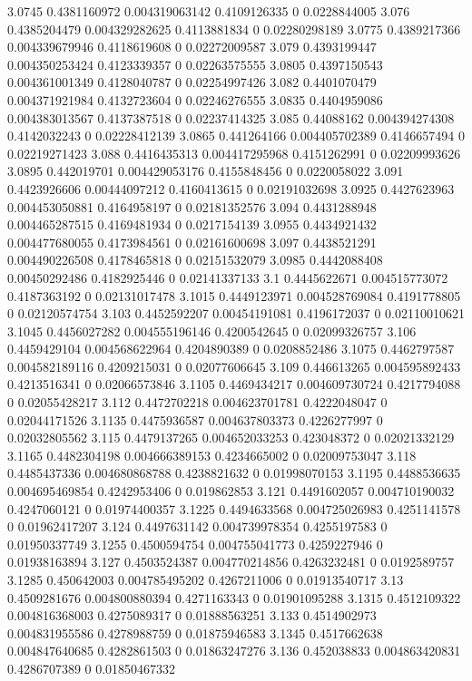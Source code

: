 {3.0745 0.4381160972 0.004319063142 0.4109126335 0 0.0228844005
3.076 0.4385204479 0.004329282625 0.4113881834 0 0.02280298189
3.0775 0.4389217366 0.004339679946 0.4118619608 0 0.02272009587
3.079 0.4393199447 0.004350253424 0.4123339357 0 0.02263575555
3.0805 0.4397150543 0.004361001349 0.4128040787 0 0.02254997426
3.082 0.4401070479 0.004371921984 0.4132723604 0 0.02246276555
3.0835 0.4404959086 0.004383013567 0.4137387518 0 0.02237414325
3.085 0.44088162 0.004394274308 0.4142032243 0 0.02228412139
3.0865 0.441264166 0.004405702389 0.4146657494 0 0.02219271423
3.088 0.4416435313 0.004417295968 0.4151262991 0 0.02209993626
3.0895 0.442019701 0.004429053176 0.4155848456 0 0.0220058022
3.091 0.4423926606 0.00444097212 0.4160413615 0 0.02191032698
3.0925 0.4427623963 0.004453050881 0.4164958197 0 0.02181352576
3.094 0.4431288948 0.004465287515 0.4169481934 0 0.0217154139
3.0955 0.4434921432 0.004477680055 0.4173984561 0 0.02161600698
3.097 0.4438521291 0.004490226508 0.4178465818 0 0.02151532079
3.0985 0.4442088408 0.00450292486 0.4182925446 0 0.02141337133
3.1 0.4445622671 0.004515773072 0.4187363192 0 0.02131017478
3.1015 0.4449123971 0.004528769084 0.4191778805 0 0.02120574754
3.103 0.4452592207 0.00454191081 0.4196172037 0 0.02110010621
3.1045 0.4456027282 0.004555196146 0.4200542645 0 0.02099326757
3.106 0.4459429104 0.004568622964 0.4204890389 0 0.0208852486
3.1075 0.4462797587 0.004582189116 0.4209215031 0 0.02077606645
3.109 0.446613265 0.004595892433 0.4213516341 0 0.02066573846
3.1105 0.4469434217 0.004609730724 0.4217794088 0 0.02055428217
3.112 0.4472702218 0.004623701781 0.4222048047 0 0.02044171526
3.1135 0.4475936587 0.004637803373 0.4226277997 0 0.02032805562
3.115 0.4479137265 0.004652033253 0.423048372 0 0.02021332129
3.1165 0.4482304198 0.004666389153 0.4234665002 0 0.02009753047
3.118 0.4485437336 0.004680868788 0.4238821632 0 0.01998070153
3.1195 0.4488536635 0.004695469854 0.4242953406 0 0.019862853
3.121 0.4491602057 0.004710190032 0.4247060121 0 0.01974400357
3.1225 0.4494633568 0.004725026983 0.4251141578 0 0.01962417207
3.124 0.4497631142 0.004739978354 0.4255197583 0 0.01950337749
3.1255 0.4500594754 0.004755041773 0.4259227946 0 0.01938163894
3.127 0.4503524387 0.004770214856 0.4263232481 0 0.0192589757
3.1285 0.450642003 0.004785495202 0.4267211006 0 0.01913540717
3.13 0.4509281676 0.004800880394 0.4271163343 0 0.01901095288
3.1315 0.4512109322 0.004816368003 0.4275089317 0 0.01888563251
3.133 0.4514902973 0.004831955586 0.4278988759 0 0.01875946583
3.1345 0.4517662638 0.004847640685 0.4282861503 0 0.01863247276
3.136 0.452038833 0.004863420831 0.4286707389 0 0.01850467332
}
